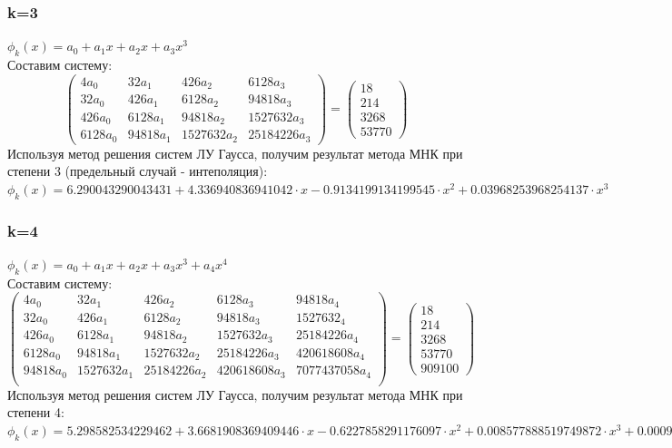 \documentclass{article}
\begin{document}
\subsubsection{k=3}
$\phi_k(x) = a_0 + a_1x + a_2x + a_3x^3$\\
Составим систему:
\begin{displaymath}
\left(
  \begin{array}{cccc}
    4 a_{0} & 32 a_{1} & 426 a_{2} & 6128 a_{3}\\
    32 a_{0} & 426 a_{1} & 6128 a_{2} & 94818 a_{3}\\
    426 a_{0} & 6128 a_{1} & 94818 a_{2} & 1527632 a_{3} \\
    6128 a_{0} & 94818 a_{1} & 1527632 a_{2} & 25184226 a_{3} 
  \end{array}
\right)
=
\left(
  \begin{array}{ccc}
    18\\
    214\\
    3268\\
    53770
  \end{array}
\right)
\end{displaymath}
Используя метод решения систем ЛУ Гаусса, получим результат метода МНК при
степени 3 (предельный случай - интеполяция):\\
$ \phi_k(x) = 
  6.290043290043431 +
  4.336940836941042 \cdot x -
  0.9134199134199545 \cdot x^2 +
  0.03968253968254137 \cdot x^3
$
\subsubsection{k=4}
$\phi_k(x) = a_0 + a_1x + a_2x + a_3x^3 + a_4x^4$\\
Составим систему:
\begin{displaymath}
\left(
  \begin{array}{ccccc}
    4 a_{0} & 32 a_{1} & 426 a_{2} & 6128 a_{3} & 94818 a_{4}\\
    32 a_{0} & 426 a_{1} & 6128 a_{2} & 94818 a_{3} & 1527632_{4}\\
    426 a_{0} & 6128 a_{1} & 94818 a_{2} & 1527632 a_{3} & 25184226 a_{4}\\
    6128 a_{0} & 94818 a_{1} & 1527632 a_{2} & 25184226 a_{3} & 420618608 a_{4}\\
    94818 a_{0} & 1527632 a_{1} & 25184226 a_{2} & 420618608 a_{3} & 7077437058 a_{4}\\
  \end{array}
\right)
=
\left(
  \begin{array}{ccc}
    18\\
    214\\
    3268\\
    53770\\
    909100
  \end{array}
\right)
\end{displaymath}
Используя метод решения систем ЛУ Гаусса, получим результат метода МНК при
степени 4: \\
$ \phi_k(x) =
  5.298582534229462 +
  3.6681908369409446 \cdot x -
  0.6227858291176097 \cdot x^2 + 
  0.008577888519749872 \cdot x^3 + 
  0.0009720203488372093 \cdot x^4
$
\end{document}
